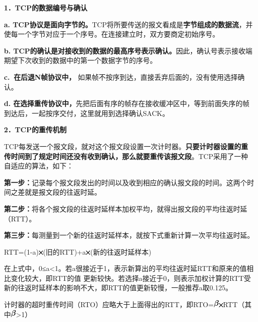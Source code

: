 \textbf{{1．TCP的数据编号与确认}}

\textbf{a.
TCP协议是面向字节的。}TCP将所要传送的报文看成是\textbf{字节组成的数据流}，并使每一个字节对应于一个序号。在连接建立时，双方要商定初始序号。

\textbf{b.
TCP的确认是对接收到的数据的最高序号表示确认。}因此，确认号表示接收端期望下次收到的数据中的第一个数据字节的序号。


\textbf{c.~在后退N帧协议中，}
如果帧不按序到达，直接丢弃后面的，没有使用选择确认。

\textbf{d.
在选择重传协议中，}先把后面有序的帧存在接收缓冲区中，等到前面失序的帧到达后，一起按序交付，这里就用到选择确认SACK。

\textbf{{2．TCP的重传机制}}

TCP每发送一个报文段，就对这个报文段设置一次计时器。\textbf{{只要计时器设置的重传时间到了规定时间还没有收到确认，那么就要重传该报文段}}。TCP采用了一种自适应的算法，如下：

{\textbf{第一步：}记录每个报文段发出的时间以及收到相应的确认报文段的时间。这两个时间之差就是报文段的往返时延。}

{\textbf{第二步：}将各个报文段的往返时延样本加权平均，就得出报文段的平均往返时延（}{RTT}{）。}

{\textbf{第三步：}}{每测量到一个新的往返时延样本，就按下式重新计算一次平均往返时延。}

{}

{RTT}={(1}-a{)\includegraphics[width=0.09375in,height=0.08333in]{texmath/ff0c81times}}{(}旧的{RTT)}+a\includegraphics[width=0.09375in,height=0.08333in]{texmath/ff0c81times}{(}新的往返时延样本{)}

{ }

{在上式中，0≤a\textless{}1。若a很接近于1，表示新算出的平均往返时延RTT和原来的值相比变化较大，即RTT的值
更新较快。若选择a接近于0，则表示加权计算的RTT受新的往返时延样本的影响不大，即RTT的值更新较慢，一般推荐a取0.125。}

{计时器的超时重传时间（RTO）应略大于上面得出的RTT，即}{RTO=\includegraphics[width=0.10417in,height=0.14583in]{texmath/338478beta}\includegraphics[width=0.09375in,height=0.08333in]{texmath/ff0c81times}RTT（其中\includegraphics[width=0.10417in,height=0.14583in]{texmath/338478beta}\textgreater{}1）}
